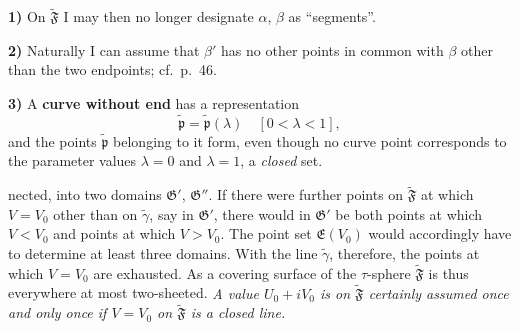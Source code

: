 \documentclass{article}
\begin{document}
\textbf{1)} On $\widetilde{\mathfrak{F}}$ I may then no longer designate $\alpha$, $\beta$ as ``segments''.

\textbf{2)} Naturally I can assume that $\beta'$ has no other points in common with $\beta$ other than the two endpoints; cf.\ p.~46.

\textbf{3)} A \textbf{curve without end} has a representation
\[ \tilde{\mathfrak{p}} = \tilde{\mathfrak{p}}(\lambda) \quad [0 < \lambda < 1], \]
and the points $\tilde{\mathfrak{p}}$ belonging to it form, even though no curve point corresponds to the parameter values $\lambda = 0$ and $\lambda = 1$, a \emph{closed} set.

nected, into two domains $\mathfrak{G}'$, $\mathfrak{G}''$. If there were further points on $\widetilde{\mathfrak{F}}$ at which $V = V_0$ other than on $\tilde{\gamma}$, say in $\mathfrak{G}'$, there would in $\mathfrak{G}'$ be both points at which $V < V_0$ and points at which $V > V_0$. The point set $\mathfrak{E}(V_0)$ would accordingly have to determine at least three domains. With the line $\tilde{\gamma}$, therefore, the points at which $V = V_0$ are exhausted. As a covering surface of the $\tau$-sphere $\widetilde{\mathfrak{F}}$ is thus everywhere at most two-sheeted. \emph{A value $U_0 + iV_0$ is on $\widetilde{\mathfrak{F}}$ certainly assumed once and only once if $V = V_0$ on $\widetilde{\mathfrak{F}}$ is a closed line.}
\end{document}
